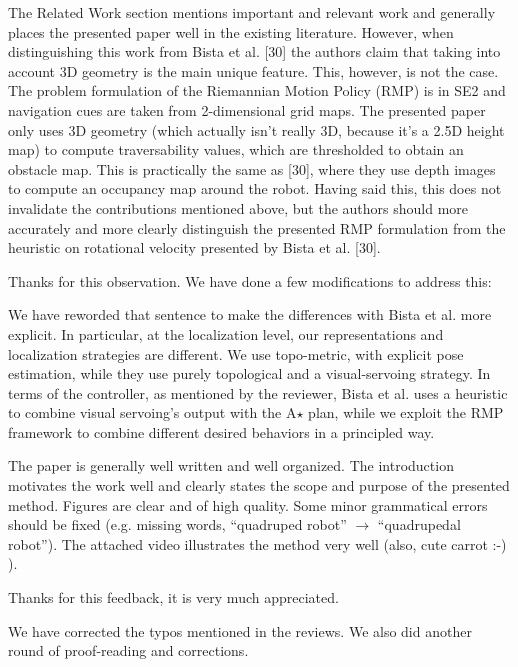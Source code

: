 \documentclass[a4paper,11pt]{article}
\begin{document}
\begin{displayquote}
	The Related Work section mentions important and relevant work and
	generally places the presented paper well in the existing literature.
	However, when distinguishing this work from Bista et al. [30] the
	authors claim that taking into account 3D geometry is the main unique
	feature. This, however, is not the case. The problem formulation of the
	Riemannian Motion Policy (RMP) is in SE2 and navigation cues are taken
	from 2-dimensional grid maps. The presented paper only uses 3D geometry
	(which actually isn’t really 3D, because it’s a 2.5D height map) to
	compute traversability values, which are thresholded to obtain an
	obstacle map. This is practically the same as [30], where they use
	depth images to compute an occupancy map around the robot. Having said
	this, this does not invalidate the contributions mentioned above, but
	the authors should more accurately and more clearly distinguish the
	presented RMP formulation from the heuristic on rotational velocity
	presented by Bista et al. [30]. 
\end{displayquote}

Thanks for this observation. We have done a few modifications to address this:
\begin{outline}[enumerate]
	\1 We have reworded that sentence to make the differences with Bista et al. 
	more explicit.
	\1 In particular, at the localization level, our representations and 
	localization strategies are different. We use topo-metric, with explicit 
	pose estimation, while they use purely topological and a visual-servoing 
	strategy.
	\1 In terms of the controller, as mentioned by the reviewer, Bista et al. 
	uses a heuristic to combine visual servoing's output with the A$\star$ 
	plan, while we exploit the RMP framework to combine different desired 
	behaviors in a principled way.
\end{outline}


\begin{displayquote}
	The paper is generally well written and well organized. The
	introduction motivates the work well and clearly states the scope and
	purpose of the presented method. Figures are clear and of high quality.
	Some minor grammatical errors should be fixed (e.g. missing words,
	“quadruped robot” $\rightarrow$ “quadrupedal robot”).
	The attached video illustrates the method very well (also, cute carrot
	:-) ).
\end{displayquote}

Thanks for this feedback, it is very much appreciated. 
\begin{outline}[enumerate]
	\1 We have corrected the typos mentioned in the reviews.
	\1 We also did another round of proof-reading and corrections.
\end{outline}
 
\end{document}
